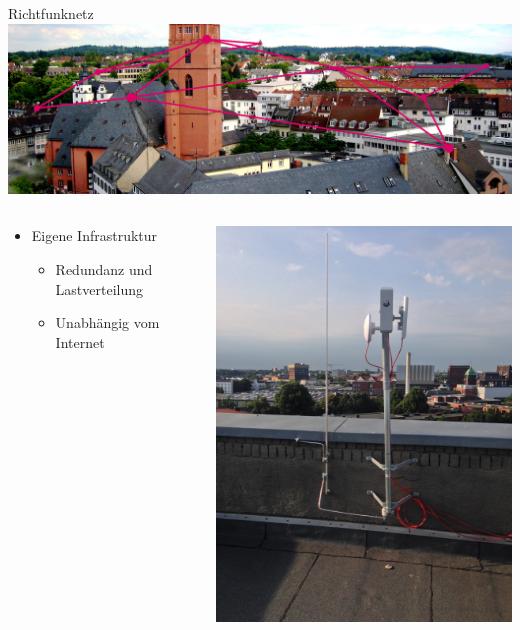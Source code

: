 \documentclass[t]{beamer}
\begin{document}
  \begin{frame}{Richtfunknetz}
    \includegraphics[width=\textwidth]{images/banner-stadtkirche-darmstadt}
    \begin{columns}
      \begin{column}{0.65\textwidth}
        \begin{itemize}
          \item Eigene Infrastruktur
          \begin{itemize}
            \item Redundanz und Lastverteilung
            \item Unabhängig vom Internet
          \end{itemize}
        \end{itemize}
      \end{column}
      \begin{column}{0.25\textwidth}
        \begin{center}
          \vspace{-1.5cm}
          \hspace{-0.75cm}
          \includegraphics[width=\textwidth]{images/hamburg-richtfunkmast}

\end{center}
\end{column}
\end{columns}
\end{frame}
\end{document}
